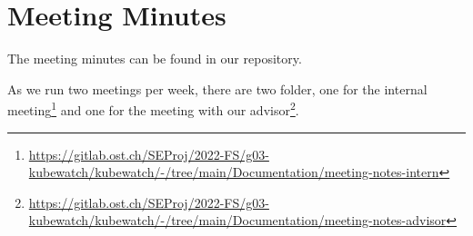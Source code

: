 \chapter{Meeting Minutes}


The meeting minutes can be found in our repository. \newline

As we run two meetings per week, there are two folder, one for the internal meeting\footnote{\url{https://gitlab.ost.ch/SEProj/2022-FS/g03-kubewatch/kubewatch/-/tree/main/Documentation/meeting-notes-intern}}
and one for the meeting with our advisor\footnote{\url{https://gitlab.ost.ch/SEProj/2022-FS/g03-kubewatch/kubewatch/-/tree/main/Documentation/meeting-notes-advisor}}.

